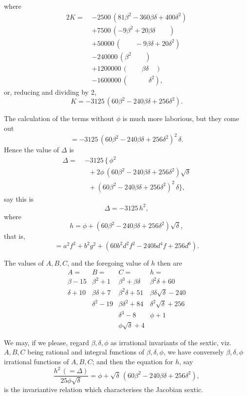 \documentclass[11pt]{article}
\begin{document}
\newpage
\noindent
where
\begin{align*}
  2K =\;& -2500\,(81\beta^{2}-360\beta\delta+400\delta^{2})\\
        & +7500\,(-9\beta^{2}+20\beta\delta\quad\quad)\\
        & +50000\,(\quad\quad-9\beta\delta+20\delta^{2})\\
        & -240000\,(\beta^{2}\quad\quad)\\
        & +1200000\,(\quad\quad\beta\delta\quad)\\
        & -1600000\,(\quad\quad\quad\delta^{2}),
\end{align*}
or, reducing and dividing by 2,
\[
  K=-3125\,(60\beta^{2}-240\beta\delta+256\delta^{2}).
\]

\medskip
The calculation of the terms without $\phi$ is much more laborious,
but they come out
\[
  =-3125\,(60\beta^{2}-240\beta\delta+256\delta^{2})^{2}\,\delta.
\]
Hence the value of $\Delta$ is
\begin{align*}
  \Delta =\;& -3125\,\bigl\{\,\phi^{2}\\
        & \;\;+2\phi\,(60\beta^{2}-240\beta\delta+256\delta^{2})\sqrt{\delta}\\
        & \;\;+(60\beta^{2}-240\beta\delta+256\delta^{2})^{2}\,\delta\bigr\},
\end{align*}
say this is
\[
  \Delta=-3125\,h^{2},
\]
where
\[
  h=\phi+(60\beta^{2}-240\beta\delta+256\delta^{2})\sqrt{\delta},
\]
that is,
\[
  =a^{2}f^{2}+b^{2}g^{2}+(60b^{2}d^{2}f^{2}-240bd^{4}f+256d^{6}).
\]

\medskip
The values of $A,B,C$, and the foregoing value of $h$ then are
\[
\begin{array}{cccc}
A= & B= & C= & h=\\[2pt]
\beta-15 & \beta^{2}+1 & \beta^{3}+\beta\delta & \beta^{2}\delta+60\\
\delta+10 & \beta\delta+7 & \beta^{2}\delta+51 & \beta\delta\sqrt{\delta}-240\\
 & \delta^{2}-19 & \beta\delta^{2}+84 & \delta^{2}\sqrt{\delta}+256\\
 & & \delta^{3}-8 & \phi+1\\
 & & \phi\sqrt{\delta}+4 &
\end{array}
\]

\medskip
We may, if we please, regard $\beta,\delta,\phi$ as irrational
invariants of the sextic, viz.\ $A,B,C$ being rational and integral
functions of $\beta,\delta,\phi$, we have conversely
$\beta,\delta,\phi$ irrational functions of $A,B,C$; and then the
equation for $h$, say
\[
  \frac{h^{2}\,(=\Delta)}{25\phi\sqrt{\delta}}
   =\phi+\sqrt{\delta}\,(60\beta^{2}-240\beta\delta+256\delta^{2}),
\]
is the invariantive relation which characterises the Jacobian
sextic.
\end{document}
